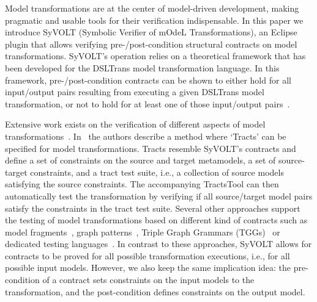 Model transformations are at the center of model-driven development, making
pragmatic and usable tools for their verification indispensable. In this paper
we introduce SyVOLT (Symbolic Verifier of mOdeL Transformations), an Eclipse plugin that allows verifying pre-/post-condition structural contracts on model transformations. SyVOLT's operation relies on a theoretical framework that has been
developed for the DSLTrans model transformation language. In this framework,
pre-/post-condition contracts can be shown to either hold for all input/output pairs resulting from
executing a given DSLTrans model transformation, or not to hold for at least
one of those input/output pairs~\cite{Lucio2014}.


Extensive work exists on the verification of different aspects of model
transformations~\cite{AmraniLSCDVTC12}. In~\cite{Vallecillo2012} the
authors describe a method where `Tracts' can be specified for model
transformations. Tracts resemble SyVOLT's contracts and define a set
of constraints on the source and target metamodels, a set of source-target constraints, and a tract test suite, i.e., a collection of source models
satisfying the source constraints. The accompanying TractsTool can then
automatically test the transformation by verifying if all source/target model
pairs satisfy the constraints in the tract test suite.
Several other approaches support the testing of model transformations based
on different kind of contracts such as model fragments~\cite{Mottu2008}, graph patterns~\cite{Guerra12,BaloghBCGHMPPRVa10},
Triple Graph Grammars (TGGs)~\cite{WieberAS14} or dedicated testing
languages~\cite{Garcia-Dominguez11}. In contrast to these approaches, SyVOLT
allows for contracts to be proved for all possible transformation executions, i.e., for all possible
input models. However, we also keep the same implication idea: the pre-condition of
a contract sets constraints on the input models to the transformation, and the post-condition defines constraints on the output model.

